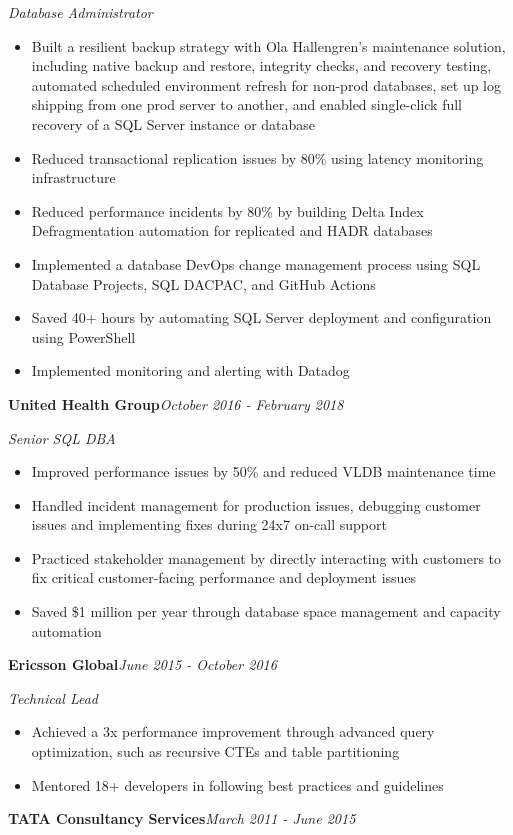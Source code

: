 \documentclass[10pt,a4paper]{article}
\begin{document}
\textit{Database Administrator}\\[-5pt]
\begin{itemize}
  \item Built a resilient backup strategy with Ola Hallengren's maintenance solution, including native backup and restore, integrity checks, and recovery testing, automated scheduled environment refresh for non-prod databases, set up log shipping from one prod server to another, and enabled single-click full recovery of a SQL Server instance or database
  \item Reduced transactional replication issues by 80\% using latency monitoring infrastructure
  \item Reduced performance incidents by 80\% by building Delta Index Defragmentation automation for replicated and HADR databases
  \item Implemented a database DevOps change management process using SQL Database Projects, SQL DACPAC, and GitHub Actions
  \item Saved 40+ hours by automating SQL Server deployment and configuration using PowerShell
  \item Implemented monitoring and alerting with Datadog
\end{itemize}
\vspace{14.7pt}
\noindent\textbf{United Health Group}\hfill \textit{October 2016 - February 2018}

\textit{Senior SQL DBA}\\[-5pt]
\begin{itemize}
  \item Improved performance issues by 50\% and reduced VLDB maintenance time
  \item Handled incident management for production issues, debugging customer issues and implementing fixes during 24x7 on-call support
  \item Practiced stakeholder management by directly interacting with customers to fix critical customer-facing performance and deployment issues
  \item Saved \$1 million per year through database space management and capacity automation
\end{itemize}
\vspace{14.7pt}
\noindent\textbf{Ericsson Global}\hfill \textit{June 2015 - October 2016}

\textit{Technical Lead}\\[-5pt]
\begin{itemize}
  \item Achieved a 3x performance improvement through advanced query optimization, such as recursive CTEs and table partitioning
  \item Mentored 18+ developers in following best practices and guidelines
\end{itemize}
\vspace{14.7pt}
\noindent\textbf{TATA Consultancy Services}\hfill \textit{March 2011 - June 2015}
\end{document}
